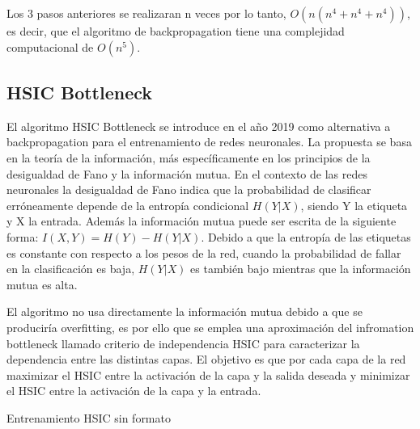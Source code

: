 Los 3 pasos anteriores se realizaran n veces por lo tanto, $O(n(n^4+n^4+n^4))$, es decir, que el algoritmo de backpropagation tiene una complejidad computacional de $O(n^5)$.

\subsection{HSIC Bottleneck}

El algoritmo HSIC Bottleneck se introduce en el año 2019 como alternativa a backpropagation para el entrenamiento de redes neuronales. La propuesta se basa en la teoría de la información, más específicamente en los principios de la desigualdad de Fano y la información mutua. En el contexto de las redes neuronales la desigualdad de Fano indica que la probabilidad de clasificar erróneamente depende de la entropía condicional $H(Y|X)$, siendo Y la etiqueta y X la entrada. Además la información mutua puede ser escrita de la siguiente forma: $I(X,Y) = H(Y) - H(Y|X)$. Debido a que la entropía de las etiquetas es constante con respecto a los pesos de la red, cuando la probabilidad de fallar en la clasificación es baja, $H(Y|X)$ es también bajo mientras que la información mutua es alta. 

El algoritmo no usa directamente la información mutua debido a que se produciría overfitting, es por ello que se emplea una aproximación del infromation bottleneck llamado criterio de independencia HSIC para caracterizar la dependencia entre las distintas capas. El objetivo es que por cada capa de la red maximizar el HSIC entre la activación de la capa y la salida deseada y minimizar el HSIC entre la activación de la capa y la entrada.

\begin{algorithm}[H]
   \caption{Entrenamiento HSIC sin formato}
   
   
\end{algorithm}

